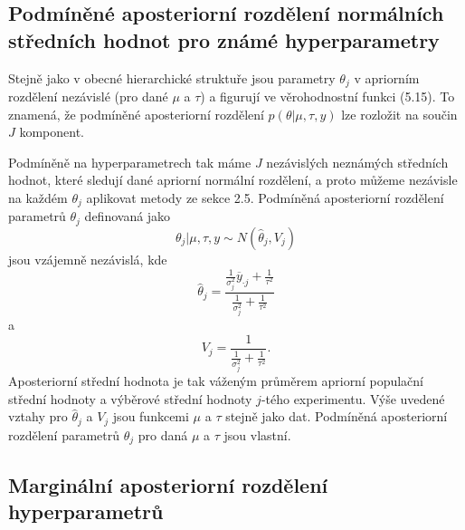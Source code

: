 \subsection{Podmíněné aposteriorní rozdělení normálních středních hodnot pro známé hyperparametry}

Stejně jako v obecné hierarchické struktuře jsou parametry $\theta_j$ v apriorním rozdělení nezávislé (pro dané $\mu$ a $\tau$) a figurují ve věrohodnostní funkci (5.15). To znamená, že podmíněné aposteriorní rozdělení $p(\theta | \mu, \tau, y)$ lze rozložit na součin $J$ komponent.

Podmíněně na hyperparametrech tak máme $J$ nezávislých neznámých středních hodnot, které sledují dané apriorní normální rozdělení, a proto můžeme nezávisle na každém $\theta_j$ aplikovat metody ze sekce 2.5. Podmíněná aposteriorní rozdělení parametrů $\theta_j$ definovaná jako
\begin{equation}
\theta_j | \mu, \tau, y \sim N(\hat{\theta}_j, V_j)
\end{equation}
jsou vzájemně nezávislá, kde
\begin{equation}
\hat{\theta}_j = \frac{\frac{1}{\sigma_j^2} \overline{y}_{\cdot j} + \frac{1}{\tau^2}}{\frac{1}{\sigma_j^2} + \frac{1}{\tau^2}}
\end{equation}
a
\begin{equation}
V_j = \frac{1}{\frac{1}{\sigma^2_j} + \frac{1}{\tau^2}}.
\end{equation}
Aposteriorní střední hodnota je tak váženým průměrem apriorní populační střední hodnoty a výběrové střední hodnoty $j$-tého experimentu. Výše uvedené vztahy pro $\hat{\theta}_j$ a $V_j$ jsou funkcemi $\mu$ a $\tau$ stejně jako dat. Podmíněná aposteriorní rozdělení parametrů $\theta_j$ pro daná $\mu$ a $\tau$ jsou vlastní.

\subsection{Marginální aposteriorní rozdělení hyperparametrů}

